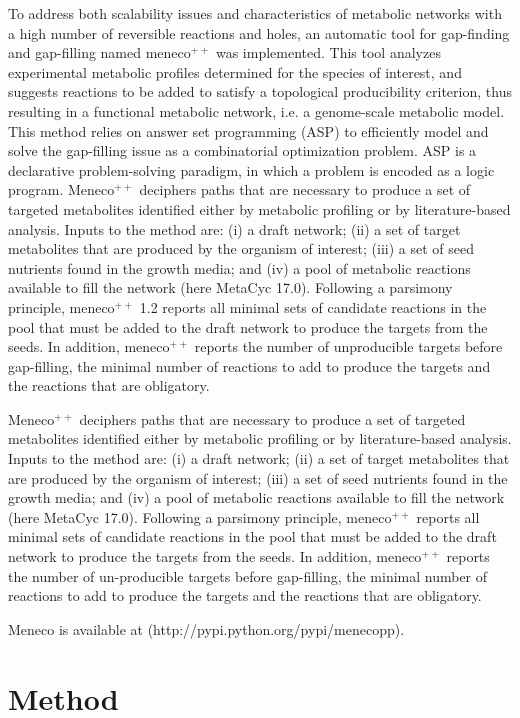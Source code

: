 \documentclass{article}
\newcommand{\Meneco}{Meneco$^{++}$\xspace}
\newcommand{\meneco}{meneco$^{++}$\xspace}
\begin{document}
To address both scalability issues and characteristics of metabolic networks with a high number of reversible reactions and holes, an automatic tool for gap-finding and gap-filling named \meneco was implemented.
This tool analyzes experimental metabolic profiles determined for the species of interest, and suggests reactions to be added to satisfy a topological producibility criterion, thus resulting in a functional metabolic network, i.e. a genome-scale metabolic model.
This method relies on answer set programming (ASP) to efficiently model and solve the gap-filling issue as a combinatorial optimization problem.
ASP is a declarative problem-solving paradigm, in which a problem is encoded as a logic program.
\Meneco deciphers paths that are necessary to produce a set of targeted metabolites identified either by metabolic profiling or by literature-based analysis.
Inputs to the method are: (i) a draft network; (ii) a set of target metabolites that are produced by the organism of interest; (iii) a set of seed nutrients found in the growth media; and (iv) a pool of metabolic reactions available to fill the network (here MetaCyc 17.0).
Following a parsimony principle, \meneco 1.2 reports all minimal sets of candidate reactions in the pool that must be added to the draft network to produce the targets from the seeds.
In addition, \meneco reports the number of unproducible targets before gap-filling, the minimal number of reactions to add to produce the targets and the reactions that are obligatory.

\Meneco deciphers paths that are necessary to produce a set of targeted metabolites identified either by metabolic profiling or by literature-based analysis.
Inputs to the method are: (i) a draft network; (ii) a set of target metabolites that are produced by the organism of interest; (iii) a set of seed nutrients found in the growth media; and (iv) a pool of metabolic reactions available to fill the network (here MetaCyc 17.0).
Following a parsimony principle, \meneco reports all minimal sets of candidate reactions in the pool that must be added to the draft network to produce the targets from the seeds.
In addition, \meneco reports the number of un-producible targets before gap-filling, the minimal number of reactions to add to produce the targets and the reactions that are obligatory.

Meneco is available at (http://pypi.python.org/pypi/menecopp).



\section{Method}
\end{document}
